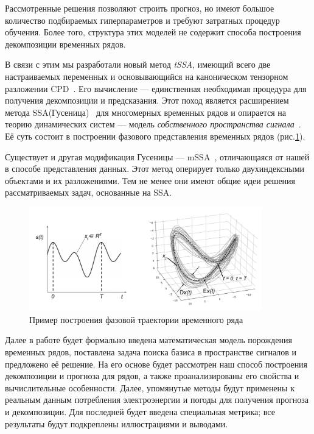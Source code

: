 		Рассмотренные решения позволяют строить прогноз, но имеют большое количество подбираемых гиперпараметров и требуют затратных процедур обучения. Более того, структура этих моделей не содержит способа построения декомпозиции временных рядов. 
		
		В связи с этим мы разработали новый метод \emph{tSSA}, имеющий всего две настраиваемых переменных и основывающийся на каноническом тензорном разложении CPD~\cite{kolda_tensors}. Его вычисление --- единственная необходимая процедура для получения декомпозиции и предсказания. Этот поход является расширением метода SSA(Гусеница)~\cite{ecfb9dc578be43ae9ee8fc88b8ff9151} для многомерных временных рядов и опирается на теорию динамических систем --- модель \textit{собственного пространства сигнала}~\cite{1572261550523548160}. Её суть состоит в построении фазового представления временных рядов (рис.\ref{pic:phase_traj}). 
		
		Существует и другая модификация Гусеницы --- mSSA~\cite{mSSA_overview}, отличающаяся от нашей в способе представления данных. Этот метод оперирует только двухиндексными объектами и их разложениями. Тем не менее они имеют общие идеи решения рассматриваемых задач, основанные на SSA.
		
		\begin{figure}[h]
			\centering
			\includegraphics[width=0.9\textwidth, keepaspectratio]{../figs/phase_traj.png}
			\caption{Пример построения фазовой траектории временного ряда}\label{pic:phase_traj}
		\end{figure}
		
		Далее в работе будет формально введена математическая модель порождения временных рядов, поставлена задача поиска базиса в пространстве сигналов и предложено её решение. На его основе будет рассмотрен наш способ построения декомпозиции и прогноза для рядов, а также проанализированы его свойства и вычислительные особенности. Далее, упомянутые методы будут применены к реальным данным потребления электроэнергии и погоды для получения прогноза и декомпозиции. Для последней будет введена специальная метрика; все результаты будут подкреплены иллюстрациями и выводами.
		 
